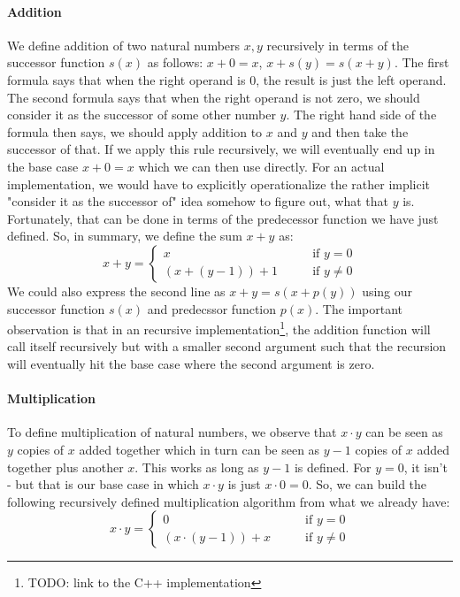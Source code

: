 \paragraph{Addition}
We define addition of two natural numbers $x,y$ recursively in terms of the successor function $s(x)$ as follows: $x + 0 = x$, $x + s(y) = s(x + y)$. The first formula says that when the right operand is $0$, the result is just the left operand. The second formula says that when the right operand is not zero, we should consider it as the successor of some other number $y$. The right hand side of the formula then says, we should apply addition to $x$ and $y$ and then take the successor of that. If we apply this rule recursively, we will eventually end up in the base case $x + 0 = x$ which we can then use directly. For an actual implementation, we would have to explicitly operationalize the rather implicit "consider it as the successor of" idea somehow to figure out, what that $y$ is. Fortunately, that can be done in terms of the predecessor function we have just defined. So, in summary, we define the sum $x+y$ as:
\begin{equation}
x+y =\begin{cases}
 x            & \qquad \text{if } y   =  0 \\
 (x+(y-1))+1  & \qquad \text{if } y \neq 0 
\end{cases}
\end{equation}
We could also express the second line as $x + y = s(x + p(y))$ using our successor function $s(x)$ and predecssor function $p(x)$. The important observation is that in an recursive implementation\footnote{TODO: link to the C++ implementation}, the addition function will call itself recursively but with a smaller second argument such that the recursion will eventually hit the base case where the second argument is zero.

\paragraph{Multiplication}
To define multiplication of natural numbers, we observe that $x \cdot y$ can be seen as $y$ copies of $x$ added together which in turn can be seen as $y-1$ copies of $x$ added together plus another $x$. This works as long as $y-1$ is defined. For $y=0$, it isn't - but that is our base case in which $x \cdot y$ is just $x \cdot 0 = 0$. So, we can build the following recursively defined multiplication algorithm from what we already have:
\begin{equation}
x \cdot y =\begin{cases}
 0                    & \qquad \text{if } y   =  0 \\
 (x \cdot (y-1)) + x  & \qquad \text{if } y \neq 0 
\end{cases}
\end{equation}


